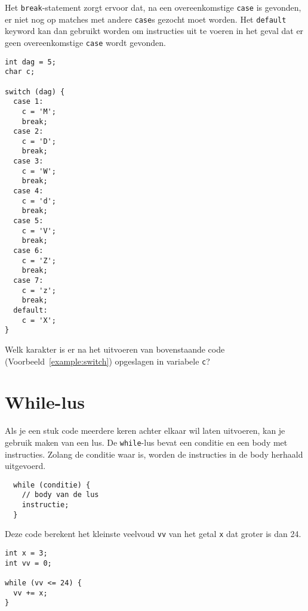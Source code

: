 \documentclass[11pt,fleqn]{book} %
\begin{document}
Het \texttt{break}-statement zorgt ervoor dat, na een overeenkomstige \texttt{case} is gevonden, er niet nog op matches met andere \texttt{case}s gezocht moet worden. Het \texttt{default} keyword kan dan gebruikt worden om instructies uit te voeren in het geval dat er geen overeenkomstige \texttt{case} wordt gevonden.

\begin{example}
	\label{example:switch}
	\phantom{ }
	\begin{verbatim}
int dag = 5;
char c;

switch (dag) {
  case 1:
    c = 'M';
    break;
  case 2:
    c = 'D';
    break;
  case 3:
    c = 'W';
    break;
  case 4:
    c = 'd';
    break;
  case 5:
    c = 'V';
    break;
  case 6:
    c = 'Z';
    break;
  case 7:
    c = 'z';
    break;
  default:
    c = 'X';
}
	\end{verbatim}
\end{example}

\begin{exercise}
	Welk karakter is er na het uitvoeren van bovenstaande code (Voorbeeld~\ref{example:switch}) opgeslagen in variabele \texttt{c}?
\end{exercise}

\section{While-lus}
Als je een stuk code meerdere keren achter elkaar wil laten uitvoeren, kan je gebruik maken van een lus. De \texttt{while}-lus bevat een conditie en een body met instructies. Zolang de conditie waar is, worden de instructies in de body herhaald uitgevoerd.

\begin{definition}[While]
	\phantom{ }
	\begin{verbatim}
  while (conditie) {
    // body van de lus
    instructie;
  }
	\end{verbatim}
	\vspace{0cm}
\end{definition}

\begin{example}[While]
	Deze code berekent het kleinste veelvoud \texttt{vv} van het getal \texttt{x} dat groter is dan 24.
	\begin{verbatim}
int x = 3;
int vv = 0;

while (vv <= 24) {
  vv += x;
}
	\end{verbatim}
\end{example}
\end{document}
